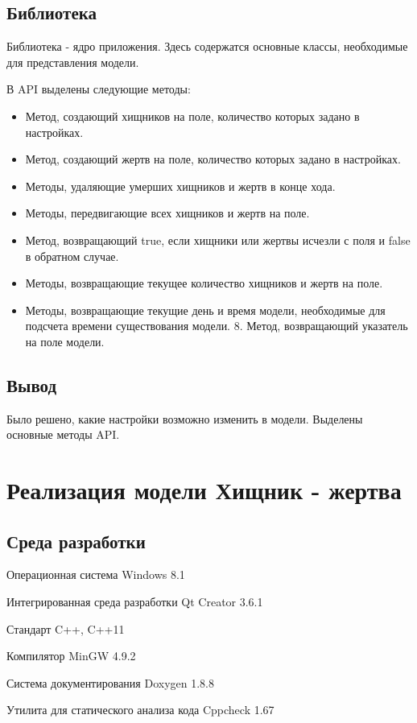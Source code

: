 \documentclass[a4paper]{article}
\begin{document}
\subsection{Библиотека}
Библиотека  - ядро приложения. Здесь содержатся основные классы, необходимые для представления модели. 

\noindent В API выделены следующие методы: 
\begin{itemize}
\item Метод, создающий хищников на поле, количество которых задано в настройках.
\item Метод, создающий жертв на поле, количество которых задано в настройках.
\item Методы, удаляющие умерших хищников и жертв в конце хода.
\item Методы, передвигающие всех хищников и жертв на поле.
\item Метод, возвращающий true, если хищники или жертвы исчезли с поля и false в обратном случае.
\item Методы, возвращающие текущее количество хищников и жертв на поле.
\item Методы, возвращающие текущие день и время модели, необходимые для подсчета времени существования модели. 
8. Метод, возвращающий указатель на поле модели. 
\end{itemize}

\subsection{Вывод}
Было решено, какие настройки возможно изменить в модели. Выделены основные методы API. 

\section{Реализация модели Хищник - жертва}
\subsection{Среда разработки}
\noindent Операционная система Windows 8.1

\noindent Интегрированная среда разработки Qt Creator 3.6.1

\noindent Стандарт C++, C++11

\noindent Компилятор MinGW 4.9.2 

\noindent Система документирования Doxygen 1.8.8

\noindent Утилита для статического анализа кода Cppcheck 1.67
\end{document}
